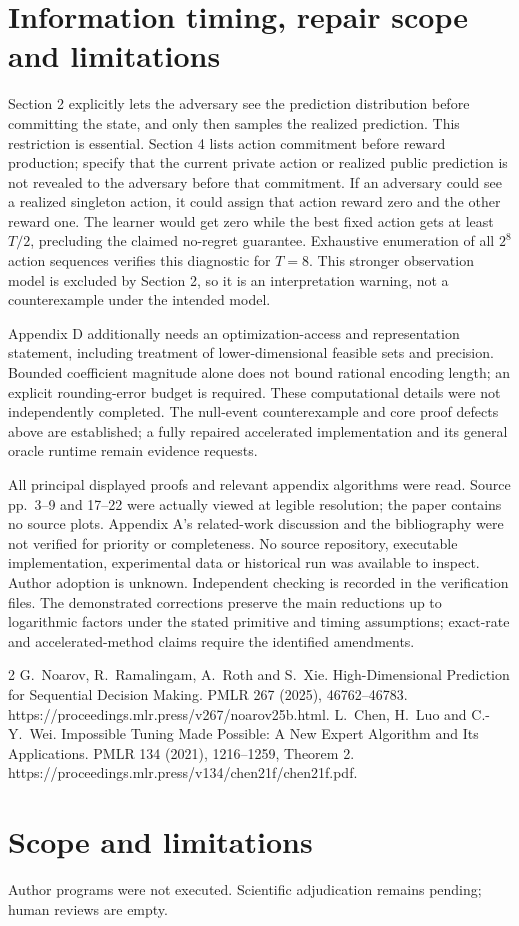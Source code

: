 \documentclass[10pt]{article}
\begin{document}
\section*{Information timing, repair scope and limitations}
Section 2 explicitly lets the adversary see the prediction distribution before committing the state, and only then samples the realized prediction. This restriction is essential. Section 4 lists action commitment before reward production; specify that the current private action or realized public prediction is not revealed to the adversary before that commitment. If an adversary could see a realized singleton action, it could assign that action reward zero and the other reward one. The learner would get zero while the best fixed action gets at least \(T/2\), precluding the claimed no-regret guarantee. Exhaustive enumeration of all \(2^8\) action sequences verifies this diagnostic for \(T=8\). This stronger observation model is excluded by Section 2, so it is an interpretation warning, not a counterexample under the intended model.\par
Appendix D additionally needs an optimization-access and representation statement, including treatment of lower-dimensional feasible sets and precision. Bounded coefficient magnitude alone does not bound rational encoding length; an explicit rounding-error budget is required. These computational details were not independently completed. The null-event counterexample and core proof defects above are established; a fully repaired accelerated implementation and its general oracle runtime remain evidence requests.\par
All principal displayed proofs and relevant appendix algorithms were read. Source pp. 3–9 and 17–22 were actually viewed at legible resolution; the paper contains no source plots. Appendix A’s related-work discussion and the bibliography were not verified for priority or completeness. No source repository, executable implementation, experimental data or historical run was available to inspect. Author adoption is unknown. Independent checking is recorded in the verification files. The demonstrated corrections preserve the main reductions up to logarithmic factors under the stated primitive and timing assumptions; exact-rate and accelerated-method claims require the identified amendments.\par
2 G. Noarov, R. Ramalingam, A. Roth and S. Xie. High-Dimensional Prediction for Sequential Decision Making. PMLR 267 (2025), 46762–46783. https://proceedings.mlr.press/v267/noarov25b.html. L. Chen, H. Luo and C.-Y. Wei. Impossible Tuning Made Possible: A New Expert Algorithm and Its Applications. PMLR 134 (2021), 1216–1259, Theorem 2. https://proceedings.mlr.press/v134/chen21f/chen21f.pdf.\par
\section*{Scope and limitations}
Author programs were not executed. Scientific adjudication remains pending; human reviews are empty.\par
\end{document}
